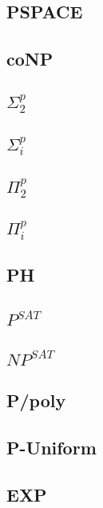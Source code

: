 \documentclass[]{article}
\theoremstyle{definition}
\begin{document}
\subsection{PSPACE}

\subsection{coNP}

\subsection{$\Sigma^p_2$}

\subsection{$\Sigma^p_i$}

\subsection{$\Pi^p_2$}

\subsection{$\Pi^p_i$}

\subsection{PH}

\subsection{$P^{SAT}$}

\subsection{$NP^{SAT}$}

\subsection{P/poly}

\subsection{P-Uniform}

\subsection{EXP}
\end{document}
